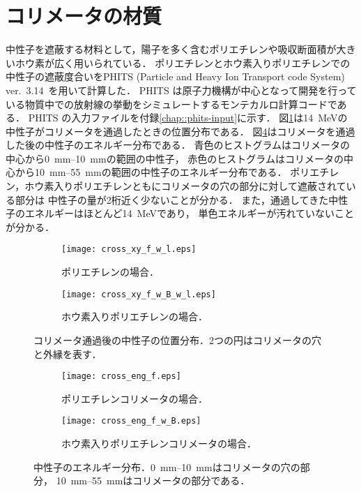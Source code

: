 \documentclass[../master]{subfiles}
\begin{document}
\section{コリメータの材質}
中性子を遮蔽する材料として，陽子を多く含むポリエチレンや吸収断面積が大きいホウ素が広く用いられている．
ポリエチレンとホウ素入りポリエチレンでの中性子の遮蔽度合いをPHITS (Particle and Heavy Ion Transport code System)
ver.~3.14~\cite{phits}を用いて計算した．
PHITS は原子力機構が中心となって開発を行っている物質中での放射線の挙動をシミュレートするモンテカルロ計算コードである．
PHITS の入力ファイルを付録\ref{chap::phits-input}に示す．
図\ref{collimator_xy_pos}は\SI{14}{\mega\electronvolt}の中性子がコリメータを通過したときの位置分布である．
図\ref{fig::neutron_energy}はコリメータを通過した後の中性子のエネルギー分布である．
青色のヒストグラムはコリメータの中心から\SIrange{0}{10}{\milli\metre}の範囲の中性子，
赤色のヒストグラムはコリメータの中心から\SIrange{10}{55}{\milli\metre}の範囲の中性子のエネルギー分布である．
ポリエチレン，ホウ素入りポリエチレンともにコリメータの穴の部分に対して遮蔽されている部分は
中性子の量が2桁近く少ないことが分かる．
また，通過してきた中性子のエネルギーはほとんど\SI{14}{\mega\electronvolt}であり，
単色エネルギーが汚れていないことが分かる．
\begin{figure}
  \centering
  \begin{subfigure}{\columnwidth}
    \centering
    \texttt{[image: cross\_xy\_f\_w\_l.eps]}
    \caption{ポリエチレンの場合．}
  \end{subfigure}
  \begin{subfigure}{\columnwidth}
    \centering
    \texttt{[image: cross\_xy\_f\_w\_B\_w\_l.eps]}
    \caption{ホウ素入りポリエチレンの場合．}
  \end{subfigure}
  \caption[コリメータ通過後の中性子の位置分布．]
          {コリメータ通過後の中性子の位置分布．2つの円はコリメータの穴と外縁を表す．}
  \label{collimator_xy_pos}
\end{figure}
\begin{figure}
  \begin{subfigure}{\columnwidth}
    \centering
    \texttt{[image: cross\_eng\_f.eps]}
    \caption{ポリエチレンコリメータの場合．}
    \label{fig::neutron_energy_dist}
  \end{subfigure}
  \begin{subfigure}{\columnwidth}
    \centering
    \texttt{[image: cross\_eng\_f\_w\_B.eps]}
    \caption{ホウ素入りポリエチレンコリメータの場合．}
    \label{fig::neutron_energy_dist_w_B}
  \end{subfigure}
  \caption[中性子のエネルギー分布．]
          {中性子のエネルギー分布．\SIrange{0}{10}{\milli\metre}はコリメータの穴の部分，
          \SIrange{10}{55}{\milli\metre}はコリメータの部分である．}
  \label{fig::neutron_energy}
\end{figure}
\end{document}
